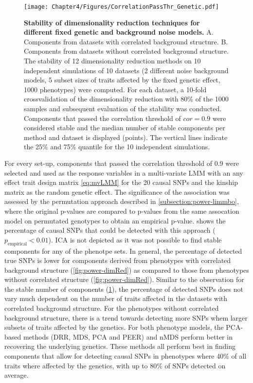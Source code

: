 \begin{figure}[hbtp]
	\centering
	\texttt{[image: Chapter4/Figures/CorrelationPassThr\_Genetic.pdf]}
\caption[\textbf{Stability of dimensionality reduction techniques for different fixed genetic and background noise models.}]{\textbf{Stability of dimensionality reduction techniques for different fixed genetic and background noise models. }A. Components from datasets with correlated background structure. B. Components from datasets without correlated background structure. The stability of \num{12} dimensionality reduction methods on \num{10} independent simulations of \num{10} datasets (\num{2} different noise background models, \num{5} subset sizes of traits affected by the fixed genetic effect, \num{1000} phenotypes) were computed.  For each dataset, a \num{10}-fold crossvalidation of the dimensionality reduction with \num{80}\% of the \num{1000} samples and subsequent evaluation of the stability was conducted. Components that passed the correlation threshold of \(cor=0.9\) were considered stable and the median number of stable components per method and dataset is displayed (points). The vertical lines indicate the \num{25}\% and \num{75}\% quantile for the \num{10} independent simulations. } 
	 	\label{fig:cor-genetic}
\end{figure}

For every set-up, components that passed the correlation threshold of \num{0.9} were selected and used as the response variables in a multi-variate LMM with an any effect trait design matrix \cref{eq:mvLMM} for the \num{20} causal SNPs and the kinship matrix as the random genetic effect. The significance of the association was assessed by the permutation approach described in \cref{subsection:power-limmbo}, where the original p-values are compared to p-values from the same assocation model on permutated genotypes to obtain an empirical p-value.  shows the percentage of causal SNPs that could be detected with this approach (\(p_\text{empirical} < 0.01\)). ICA is not depicted as it was not possible to find stable components for any of the phenotpe sets.  In general, the percentage of detected true SNPs is lower for components derived from phenotypes with correlated background structure (\cref{fig:power-dimRed}) as compared to those from phenotypes without correlated structure (\cref{fig:power-dimRed}). Similar to the observation for the stable number of components (\cref{fig:cor-genetic}), the percentage of detected SNPs does not vary much dependent on the number of traits affected in the datasets with correlated background structure. For the phenotypes without correlated background structure, there is a trend towards detecting more SNPs whem larger subsets of traits affected by the genetics. For both phenotype models, the PCA-based methods (DRR, MDS, PCA and PEER) and nMDS perform better in recovering the underlying genetics. These methods all perform best in finding components that allow for detecting causal SNPs in phenotypes where \num{40}\% of all traits where affected by the genetics, with up to \num{80}\% of SNPs detected on average. 

